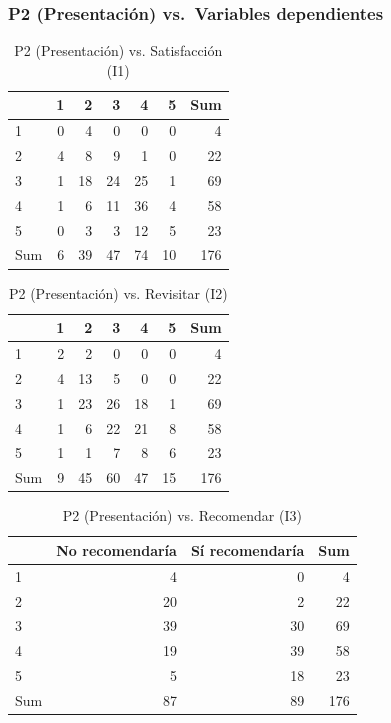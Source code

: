 \documentclass[
  spanish,
]{article}
\begin{document}
\subsubsection{P2 (Presentación) vs.~Variables
dependientes}\label{p2-presentaciuxf3n-vs.-variables-dependientes}

\begin{longtable}[t]{lrrrrrr}
\caption{\label{tab:cont-p2-satisf}P2 (Presentación) vs. Satisfacción (I1)}\\
\toprule
 & 1 & 2 & 3 & 4 & 5 & Sum\\
\midrule
1 & 0 & 4 & 0 & 0 & 0 & 4\\
2 & 4 & 8 & 9 & 1 & 0 & 22\\
3 & 1 & 18 & 24 & 25 & 1 & 69\\
4 & 1 & 6 & 11 & 36 & 4 & 58\\
5 & 0 & 3 & 3 & 12 & 5 & 23\\
\addlinespace
Sum & 6 & 39 & 47 & 74 & 10 & 176\\
\bottomrule
\end{longtable}

\begin{longtable}[t]{lrrrrrr}
\caption{\label{tab:cont-p2-revis}P2 (Presentación) vs. Revisitar (I2)}\\
\toprule
 & 1 & 2 & 3 & 4 & 5 & Sum\\
\midrule
1 & 2 & 2 & 0 & 0 & 0 & 4\\
2 & 4 & 13 & 5 & 0 & 0 & 22\\
3 & 1 & 23 & 26 & 18 & 1 & 69\\
4 & 1 & 6 & 22 & 21 & 8 & 58\\
5 & 1 & 1 & 7 & 8 & 6 & 23\\
\addlinespace
Sum & 9 & 45 & 60 & 47 & 15 & 176\\
\bottomrule
\end{longtable}

\begin{longtable}[t]{lrrr}
\caption{\label{tab:cont-p2-recom}P2 (Presentación) vs. Recomendar (I3)}\\
\toprule
 & No recomendaría & Sí recomendaría & Sum\\
\midrule
1 & 4 & 0 & 4\\
2 & 20 & 2 & 22\\
3 & 39 & 30 & 69\\
4 & 19 & 39 & 58\\
5 & 5 & 18 & 23\\
\addlinespace
Sum & 87 & 89 & 176\\
\bottomrule
\end{longtable}
\end{document}

